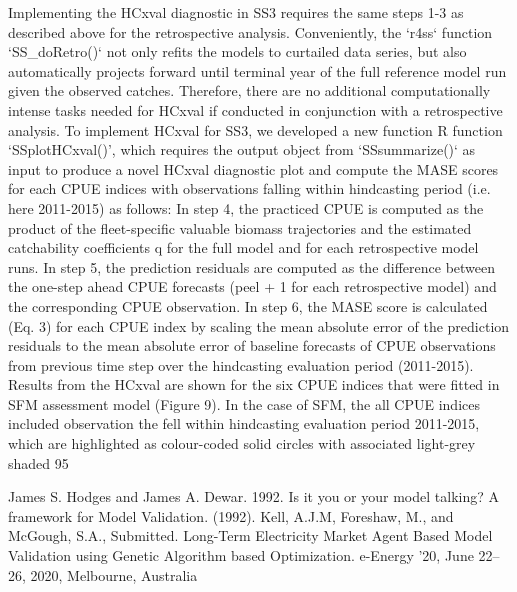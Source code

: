 Implementing the HCxval diagnostic in SS3 requires the same steps 1-3 as described above for the retrospective analysis. Conveniently, the `r4ss` function `SS_doRetro()` not only refits the models to curtailed data series, but also automatically projects forward until terminal year of the full reference model run given the observed catches. Therefore, there are no additional computationally intense tasks needed for HCxval if conducted in conjunction with a retrospective analysis. To implement HCxval for SS3, we developed a new function R function ‘SSplotHCxval()’, which requires the output object from `SSsummarize()` as input to produce a novel HCxval diagnostic plot and compute the MASE scores for each CPUE indices with observations falling within hindcasting period (i.e. here 2011-2015) as follows: In step 4, the practiced CPUE is computed as the product of the fleet-specific valuable  biomass trajectories and the estimated catchability coefficients q for the full model and for each retrospective model runs. In step 5, the prediction residuals are computed as the difference between the one-step ahead CPUE forecasts (peel + 1 for each retrospective model) and the corresponding CPUE observation. In step 6, the MASE score is calculated (Eq. 3) for each CPUE index by scaling the mean absolute error of the prediction residuals to the mean absolute error of baseline forecasts of CPUE observations from previous time step over the hindcasting evaluation period (2011-2015). 
Results from the HCxval are shown for the six CPUE indices that were fitted in SFM assessment model (Figure 9). In the case of SFM, the all CPUE indices included observation the fell within hindcasting evaluation period 2011-2015, which are highlighted as colour-coded solid circles with associated light-grey shaded 95%

James S. Hodges and James A. Dewar. 1992. Is it you or your model talking? A framework for Model Validation. (1992).
Kell, A.J.M, Foreshaw, M., and McGough, S.A., Submitted. Long-Term Electricity Market Agent Based Model Validation using Genetic Algorithm based Optimization. e-Energy ’20, June 22–26, 2020, Melbourne, Australia


